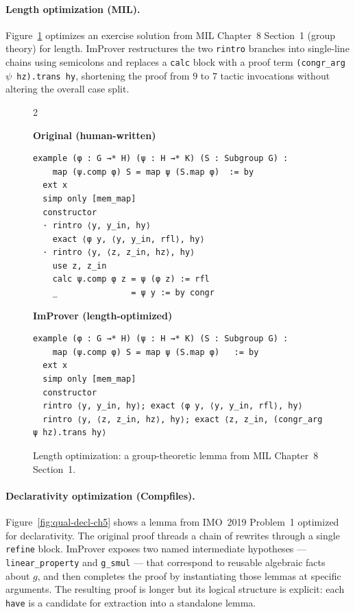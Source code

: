 \paragraph{Length optimization (MIL).} Figure~\ref{fig:qual-len-ch5} optimizes an exercise solution from MIL Chapter~8 Section~1 (group theory) for length. ImProver restructures the two \texttt{rintro} branches into single-line chains using semicolons and replaces a \texttt{calc} block with a proof term \texttt{(congr\_arg \(\psi\) hz).trans hy}, shortening the proof from $9$ to $7$ tactic invocations without altering the overall case split.

\setlength{\columnsep}{0.2cm}
\begin{figure}[ht]
\begin{multicols}{2}
{
\textbf{Original (human-written)}
\begin{scriptsize}
\begin{lstlisting}[basicstyle=\scriptsize\ttfamily]
example (φ : G →* H) (ψ : H →* K) (S : Subgroup G) :
    map (ψ.comp φ) S = map ψ (S.map φ)  := by
  ext x
  simp only [mem_map]
  constructor
  · rintro ⟨y, y_in, hy⟩
    exact ⟨φ y, ⟨y, y_in, rfl⟩, hy⟩
  · rintro ⟨y, ⟨z, z_in, hz⟩, hy⟩
    use z, z_in
    calc ψ.comp φ z = ψ (φ z) := rfl
    _               = ψ y := by congr
\end{lstlisting}
\end{scriptsize}
}
\vfill\null
\columnbreak
{
\textbf{ImProver (length-optimized)}
\begin{scriptsize}
\begin{lstlisting}[basicstyle=\scriptsize\ttfamily]
example (φ : G →* H) (ψ : H →* K) (S : Subgroup G) :
    map (ψ.comp φ) S = map ψ (S.map φ)   := by
  ext x
  simp only [mem_map]
  constructor
  rintro ⟨y, y_in, hy⟩; exact ⟨φ y, ⟨y, y_in, rfl⟩, hy⟩
  rintro ⟨y, ⟨z, z_in, hz⟩, hy⟩; exact ⟨z, z_in, (congr_arg ψ hz).trans hy⟩
\end{lstlisting}
\end{scriptsize}
}
\end{multicols}
\vspace{-2.5em}
\caption{Length optimization: a group-theoretic lemma from MIL Chapter~8 Section~1.}
\label{fig:qual-len-ch5}
\end{figure}

\paragraph{Declarativity optimization (Compfiles).} Figure~\ref{fig:qual-decl-ch5} shows a lemma from IMO~2019 Problem~1 optimized for declarativity. The original proof threads a chain of rewrites through a single \texttt{refine} block. ImProver exposes two named intermediate hypotheses --- \texttt{linear\_property} and \texttt{g\_smul} --- that correspond to reusable algebraic facts about $g$, and then completes the proof by instantiating those lemmas at specific arguments. The resulting proof is longer but its logical structure is explicit: each \texttt{have} is a candidate for extraction into a standalone lemma.

